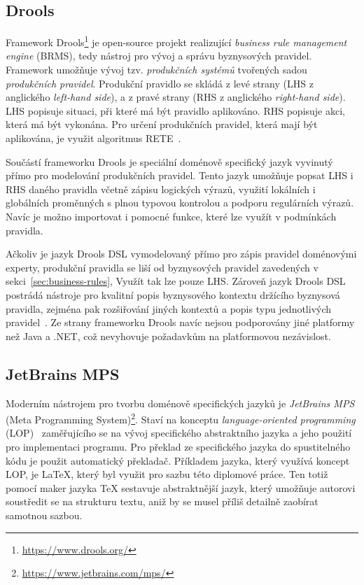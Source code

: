 \subsection{Drools}\label{sec:drools}

Framework Drools\footnote{\url{https://www.drools.org/}} je open-source projekt realizující
\textit{business rule management engine} (\gls{BRMS}), tedy nástroj pro vývoj a správu byznysových
pravidel. Framework umožňuje vývoj tzv. \textit{produkčních systémů} tvořených sadou \textit{produkčních pravidel}.
Produkční pravidlo se skládá z levé strany (\gls{LHS} z anglického \textit{left-hand side}),
a z pravé strany (\gls{RHS} z anglického \textit{right-hand side}).
\gls{LHS} popisuje situaci, při které má být pravidlo aplikováno. \gls{RHS} popisuje akci,
která má být vykonána. Pro určení produkčních pravidel, která mají být aplikována, je využit
algoritmus RETE~\cite{forgy1988rete}.

Součástí frameworku Drools je speciální doménově specifický jazyk vyvinutý přímo
pro modelování produkčních pravidel. Tento jazyk umožňuje popsat \gls{LHS} i \gls{RHS}
daného pravidla včetně zápisu logických výrazů, využití lokálních i globálních proměnných
s plnou typovou kontrolou a podporu regulárních výrazů. Navíc je možno importovat i pomocné funkce, které lze
využít v podmínkách pravidla.

Ačkoliv je jazyk Drools \gls{DSL} vymodelovaný přímo pro zápis pravidel doménovými experty,
produkční pravidla se liší od byznysových pravidel zavedených v sekci~\ref{sec:business-rules},
Využít tak lze pouze \gls{LHS}. Zároveň jazyk Drools \gls{DSL} postrádá
nástroje pro kvalitní popis byznysového kontextu držícího byznysová pravidla,
zejména pak rozšiřování jiných kontextů a popis typu jednotlivých pravidel~\cite{cemus2017automated}.
Ze strany frameworku Drools navíc nejsou podporovány jiné platformy než Java a .NET, což nevyhovuje
požadavkům na platformovou nezávislost.

\subsection{JetBrains MPS}

Moderním nástrojem pro tvorbu doménově specifických jazyků je \textit{JetBrains MPS}
(Meta Programming System)\footnote{\url{https://www.jetbrains.com/mps/}}.
Staví na konceptu \textit{language-oriented programming} (\gls{LOP})~\cite{ward1994language} zaměřujícího
se na vývoj specifického abstraktního jazyka a jeho použití pro implementaci programu. Pro překlad ze specifického
jazyka do spustitelného kódu je použit automatický překladač. Příkladem jazyka, který využívá koncept \gls{LOP},
je \LaTeX\xspace, který byl využit pro sazbu této diplomové práce. Ten totiž pomocí maker jazyka \TeX\xspace
sestavuje abstraktnější jazyk, který umožňuje autorovi soustředit se na strukturu textu, aniž by
se musel příliš detailně zaobírat samotnou sazbou.

